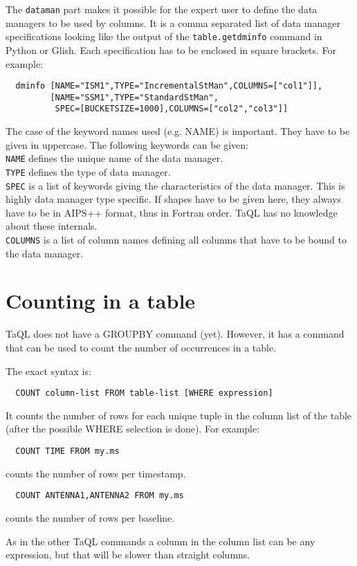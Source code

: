 The \texttt{dataman} part makes it possible for the expert user to
define the data managers to be used by columns. It is a comma separated
list of data manager specifications looking like the output of the
\texttt{table.getdminfo} command in Python or Glish.
Each specification has to be enclosed in square brackets.
For example:
\begin{verbatim}
  dminfo [NAME="ISM1",TYPE="IncrementalStMan",COLUMNS=["col1"]],
         [NAME="SSM1",TYPE="StandardStMan",
          SPEC=[BUCKETSIZE=1000],COLUMNS=["col2","col3"]]
\end{verbatim}
The case of the keyword names used (e.g. NAME) is important.
They have to be given in uppercase. The following keywords can be
given:
\\\texttt{NAME} defines the unique name of the data manager.
\\\texttt{TYPE} defines the type of data manager.
\\\texttt{SPEC} is a list of keywords giving the characteristics of the
data manager. This is highly data manager type specific. If shapes
have to be given here, they always have to be in AIPS++ format,
thus in Fortran order. TaQL has no knowledge about these internals.
\\\texttt{COLUMNS} is a list of column names defining all columns that
have to be bound to the data manager.


\section{\label{TAQL:COUNTING}Counting in a table}
TaQL does not have a GROUPBY command (yet). However, it has a command
that can be used to count the number of occurrences in a table.

The exact syntax is:
\begin{verbatim}
  COUNT column-list FROM table-list [WHERE expression]
\end{verbatim}
It counts the number of rows for each unique tuple in the column list
of the table (after the possible WHERE selection is done).
For example:
\begin{verbatim}
  COUNT TIME FROM my.ms
\end{verbatim}
counts the number of rows per timestamp.
\begin{verbatim}
  COUNT ANTENNA1,ANTENNA2 FROM my.ms
\end{verbatim}
counts the number of rows per baseline.

As in the other TaQL commands a column in the column list can be any
expression, but that will be slower than straight columns.

